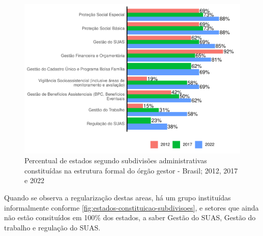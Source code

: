 \documentclass[
  brazilian]{report}
\begin{document}
\begin{figure}
\includegraphics{Censo-SUAS-2022_files/figure-latex/uf_subd-1} \caption[Percentual de estados segundo subdivisões administrativas constituídas na estrutura formal do órgão gestor - Brasil]{Percentual de estados segundo subdivisões administrativas constituídas na estrutura formal do órgão gestor - Brasil; 2012, 2017 e 2022}\label{fig:uf_subd}
\end{figure}

Quando se observa a regularização destas areas, há um grupo instituídas
informalmente conforme \cref{fig:estados-constituicao-subdivisoes}, e
setores que ainda não estão consituídos em 100\% dos estados, a saber
Gestão do SUAS, Gestão do trabalho e regulação do SUAS.
\end{document}
